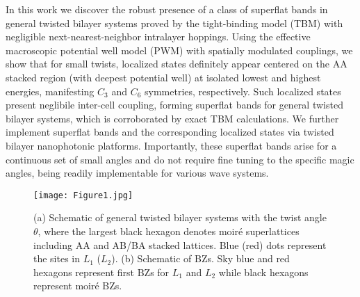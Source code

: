 \documentclass[%
reprint,
amsmath,amssymb,amsfonts
aps,
superscriptaddress,
prx
]{revtex4-1}
\begin{document}
In this work we discover the robust presence of a class of superflat bands in general twisted bilayer systems proved by the tight-binding model (TBM) with negligible next-nearest-neighbor intralayer hoppings. Using the effective macroscopic potential well model (PWM) with spatially modulated couplings, we show that for small twists, localized states definitely appear centered on the AA stacked region (with deepest potential well) at isolated lowest and highest energies, manifesting $C_3$ and $C_6$ symmetries, respectively. Such localized states present neglibile inter-cell coupling, forming superflat bands for general twisted bilayer systems, which is corroborated by exact TBM calculations. We further implement superflat bands and the corresponding localized states via twisted bilayer nanophotonic platforms. Importantly, these superflat bands arise for a continuous set of small angles and do not require fine tuning to the specific magic angles, being readily implementable for various wave systems. 
\begin{figure} 
\texttt{[image: Figure1.jpg]}%
\caption{(a) Schematic of general twisted bilayer systems with the twist angle $\theta$, where the largest black hexagon denotes moir\'e superlattices including AA and AB/BA stacked lattices. 
Blue (red) dots represent the sites in $L_1$ ($L_2$). 
(b) Schematic of BZs. Sky blue and red hexagons represent first BZs for $L_1$ and $L_2$ while black hexagons represent moir\'e BZs.} 
\label{fig:1}
\end{figure}%
\end{document}
